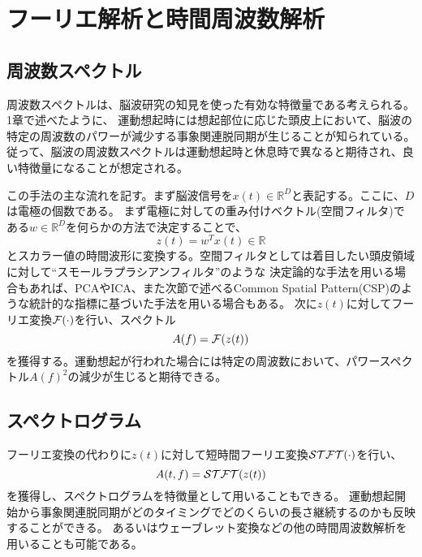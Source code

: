 
\section{フーリエ解析と時間周波数解析}

\subsection{周波数スペクトル}
周波数スペクトルは、脳波研究の知見を使った有効な特徴量である考えられる。
1章で述べたように、
運動想起時には想起部位に応じた頭皮上において、脳波の特定の周波数のパワーが減少する事象関連脱同期が生じることが知られている。
従って、脳波の周波数スペクトルは運動想起時と休息時で異なると期待され、良い特徴量になることが想定される。

この手法の主な流れを記す。まず脳波信号を\(x(t) \in \mathbb{R}^D\)と表記する。ここに、\(D\)は電極の個数である。
まず電極に対しての重み付けベクトル(空間フィルタ)である$w \in \mathbb{R}^D$を何らかの方法で決定することで、
\begin{equation}
    z(t) = w^T x(t) \in \mathbb{R}    
\end{equation}
とスカラー値の時間波形に変換する。空間フィルタとしては着目したい頭皮領域に対して``スモールラプラシアンフィルタ''のような
決定論的な手法を用いる場合もあれば、PCAやICA、また次節で述べるCommon Spatial Pattern(CSP)のような統計的な指標に基づいた手法を用いる場合もある。
次に$z(t)$に対してフーリエ変換${\cal F}(\cdot)$を行い、スペクトル
\begin{equation}
    A(f) = {\cal F}(z(t))
\end{equation}
を獲得する。運動想起が行われた場合には特定の周波数において、パワースペクトル\(A(f)^2\)の減少が生じると期待できる。

\subsection{スペクトログラム}
フーリエ変換の代わりに$z(t)$に対して短時間フーリエ変換${\cal STFT}(\cdot)$を行い、
\begin{equation}
    A(t,f) = {\cal STFT}(z(t))
\end{equation}
を獲得し、スペクトログラムを特徴量として用いることもできる。
運動想起開始から事象関連脱同期がどのタイミングでどのくらいの長さ継続するのかも反映することができる。
あるいはウェーブレット変換などの他の時間周波数解析を用いることも可能である。